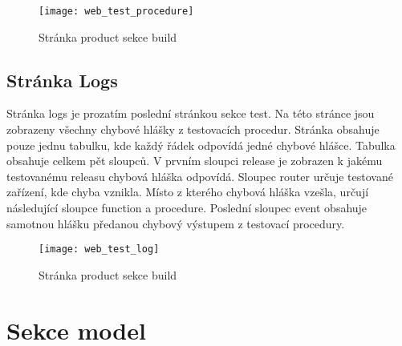 \begin{figure}[h]
  \centering
  \texttt{[image: web\_test\_procedure]}
  \caption{Stránka product sekce build}
  \label{fig:web_test_device}
\end{figure}

\subsection{Stránka Logs}
Stránka logs je prozatím poslední stránkou sekce test. Na této stránce jsou zobrazeny všechny chybové hlášky z testovacích procedur. Stránka obsahuje pouze jednu tabulku, kde každý řádek odpovídá jedné chybové hlášce. Tabulka obsahuje celkem pět sloupců. V prvním sloupci release je zobrazen k jakému testovanému releasu chybová hláška odpovídá. Sloupec router určuje testované zařízení, kde chyba vznikla. Místo z kterého chybová hláška vzešla, určují následující sloupce function a procedure. Poslední sloupec event obsahuje samotnou hlášku předanou chybový výstupem z testovací procedury.

\begin{figure}[h]
  \centering
  \texttt{[image: web\_test\_log]}
  \caption{Stránka product sekce build}
  \label{fig:web_test_device}
\end{figure}

\section{Sekce model}

\endinput
